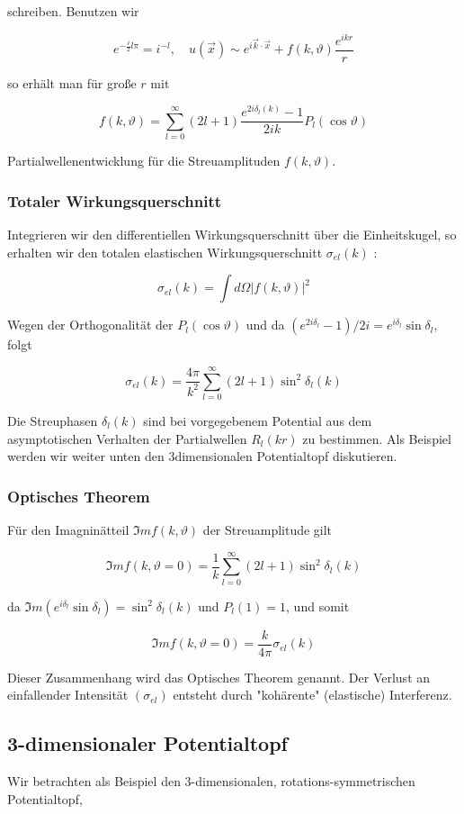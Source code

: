 \documentclass[10pt, letterpaper]{article}
\begin{document}
schreiben. Benutzen wir

$$
e^{-\frac{i}{2} l \pi}=i^{-l}, \quad u(\vec{x}) \sim e^{i \vec{k} \cdot \vec{x}}+f(k, \vartheta) \frac{e^{i k r}}{r}
$$

so erhält man für große $r$ mit

$$
f(k, \vartheta)=\sum_{l=0}^{\infty}(2 l+1) \frac{e^{2 i \delta_{l}(k)}-1}{2 i k} P_{l}(\cos \vartheta)
$$

Partialwellenentwicklung für die Streuamplituden $f(k, \vartheta)$.

\subsubsection*{Totaler Wirkungsquerschnitt}
Integrieren wir den differentiellen Wirkungsquerschnitt über die Einheitskugel, so erhalten wir den totalen elastischen Wirkungsquerschnitt $\sigma_{e l}(k)$ :

$$
\sigma_{e l}(k)=\int d \Omega|f(k, \vartheta)|^{2}
$$

Wegen der Orthogonalität der $P_{l}(\cos \vartheta)$ und da $\left(e^{2 i \delta_{l}}-1\right) / 2 i=e^{i \delta_{l}} \sin \delta_{l}$, folgt

$$
\sigma_{e l}(k)=\frac{4 \pi}{k^{2}} \sum_{l=0}^{\infty}(2 l+1) \sin ^{2} \delta_{l}(k)
$$

Die Streuphasen $\delta_{l}(k)$ sind bei vorgegebenem Potential aus dem asymptotischen Verhalten der Partialwellen $R_{l}(k r)$ zu bestimmen. Als Beispiel werden wir weiter unten den 3dimensionalen Potentialtopf diskutieren.

\subsubsection*{Optisches Theorem}
Für den Imagninätteil $\Im m f(k, \vartheta)$ der Streuamplitude gilt

$$
\Im m f(k, \vartheta=0)=\frac{1}{k} \sum_{l=0}^{\infty}(2 l+1) \sin ^{2} \delta_{l}(k)
$$

da $\Im m\left(e^{i \delta_{l}} \sin \delta_{l}\right)=\sin ^{2} \delta_{l}(k)$ und $P_{l}(1)=1$, und somit

$$
\Im m f(k, \vartheta=0)=\frac{k}{4 \pi} \sigma_{e l}(k)
$$

Dieser Zusammenhang wird das Optisches Theorem genannt. Der Verlust an einfallender Intensität $\left(\sigma_{e l}\right)$ entsteht durch "kohärente" (elastische) Interferenz.

\subsection*{3-dimensionaler Potentialtopf}
Wir betrachten als Beispiel den 3-dimensionalen, rotations-symmetrischen Potentialtopf,
\end{document}
